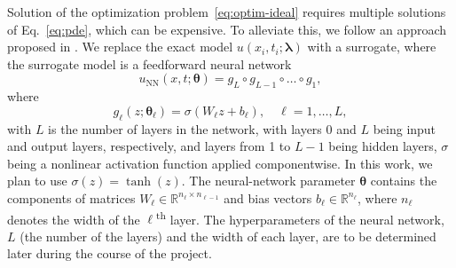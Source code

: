 \documentclass[a4paper, 12pt, parskip]{scrartcl}
\renewcommand{\vec}[1]{\boldsymbol{#1}}
\newcommand{\VTheta}{\ensuremath{\vec{\theta}}}
\newcommand{\VLambda}{\ensuremath{\vec{\lambda}}}
\newcommand{\R}{\mathbb R}
\newcommand{\UNN}[1][\text{NN}]{u_{#1}}
\begin{document}
Solution of the optimization problem~\eqref{eq:optim-ideal} requires multiple
solutions of Eq.~\eqref{eq:pde}, which can be expensive.
To alleviate this, we follow an approach proposed in \cite{raissi2017pinnII}.
We replace the exact
model $u(x_i, t_i; \VLambda)$ with a surrogate, where the surrogate model is a
feedforward neural network \cite{goodfellow2016deep}
\begin{equation}
\UNN(x, t; \vec{\theta}) = g_L \circ g_{L-1} \circ \dots \circ g_1,
\end{equation}
where
\[
    g_\ell(z; \VTheta_\ell) = \sigma (W_\ell z + b_\ell), \quad \ell = 1,\dots,L,
\]
with $L$ is the number of layers in the network, with layers 0 and $L$ being
input and output layers, respectively, and layers from 1 to $L-1$ being hidden
layers, $\sigma$ being a nonlinear activation function applied
componentwise. In this work, we plan to use \( \sigma(z) = \tanh (z) \).
The neural-network parameter $\VTheta$ contains the components of matrices
$W_\ell \in \R^{n_{\ell}\times n_{\ell-1}}$ and bias vectors
$b_\ell \in \R^{n_\ell}$, where $n_\ell$ denotes the width of the
$\ell$\textsuperscript{th} layer.
The hyperparameters of the neural network, $L$ (the number of the layers) and
the width of each layer, are to be determined later during the course of the
project.
\end{document}
